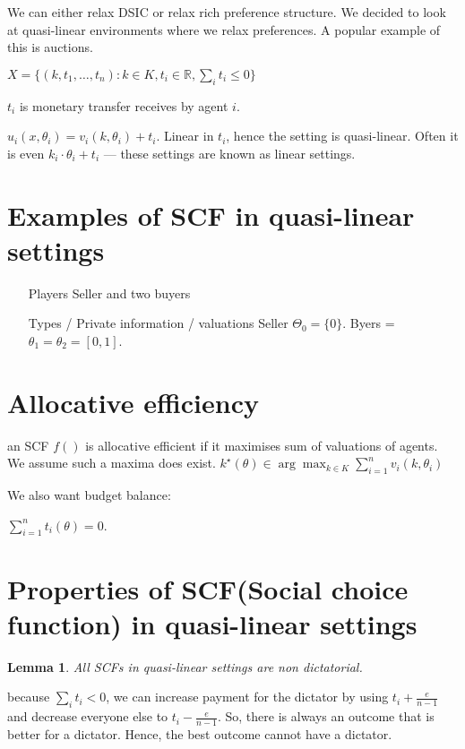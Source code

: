 \documentclass[11pt]{book}
\newcommand{\R}{\ensuremath{\mathbb R}}
\newtheorem{lemma}[corollary]{Lemma}
\begin{document}
We can either relax DSIC or relax rich preference structure. We decided
to look at quasi-linear environments where we relax preferences. A popular
example of this is auctions.

$X = \{ (k, t_1, \dots, t_n) : k \in K, t_i \in \R, \sum_i t_i \leq 0 \}$

$t_i$ is monetary transfer receives by agent $i$.

$u_i(x, \theta_i) = v_i(k, \theta_i) + t_i$. Linear in $t_i$, hence
the setting is quasi-linear. Often it is even $k_i \cdot \theta_i + t_i$ --- these
settings are known as linear settings.

\section{Examples of SCF in quasi-linear settings}
\begin{itemize}
    \item[Players] Seller and two buyers
    \item [Types / Private information / valuations] Seller $\Theta_0 = \{ 0 \}$. Byers = $\theta_1 =\theta_2 = [0, 1]$.
\end{itemize}

\section{Allocative efficiency}
an SCF $f()$ is allocative efficient if it maximises sum of valuations
of agents. We assume such a maxima does exist.
$k^{\star}(\theta) \in \arg \max_{k \in K} \sum_{i=1}^n v_i(k, \theta_i)$

We also want budget balance:

$\sum_{i=1}^n t_i(\theta) = 0$.

\section{Properties of SCF(Social choice function) in quasi-linear settings}

\begin{lemma}
All SCFs in quasi-linear settings are non dictatorial.
\end{lemma}

because $\sum_i t_i < 0$, we can increase payment for the dictator by using
$t_i + \frac{e}{n - 1}$ and decrease everyone else to $t_i - \frac{e}{n-1}$.
So, there is always an outcome that is better for a dictator. Hence,
the best outcome cannot have a dictator.
\end{document}
